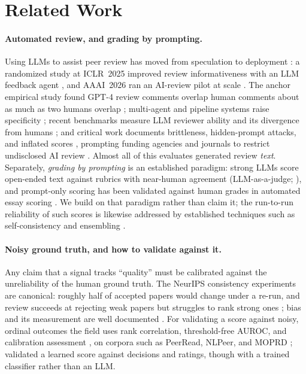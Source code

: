 \section{Related Work}
\label{sec:related}

\paragraph{Automated review, and grading by prompting.}
Using LLMs to assist peer review has moved from speculation to deployment
\citep{zhuang2025asprsurvey}: a randomized study at ICLR~2025 improved review informativeness with
an LLM feedback agent \citep{thakkar2026feedback}, and AAAI~2026 ran an AI-review pilot at scale
\citep{biswas2026aaai}. The anchor empirical study found GPT-4 review comments overlap
human comments about as much as two humans overlap \citep{liang2024llm}; multi-agent and
pipeline systems raise specificity \citep{darcy2024marg,lu2024aiscientist}; recent
benchmarks measure LLM reviewer ability and its divergence from humans
\citep{li2026llmreviewer,reviewertoo2025}; and critical work documents brittleness,
hidden-prompt attacks, and inflated scores
\citep{du2024llmsassist,zhou2024reliable,lin2025hidden,zhou2025positivereview,russolatona2024lottery,pangram2026iclr,zhu2025reviewer},
prompting funding agencies and journals to restrict undisclosed AI review
\citep{science2025funding}. Almost all of this evaluates generated review \emph{text}.
Separately, \emph{grading by prompting} is an established paradigm: strong LLMs score
open-ended text against rubrics with near-human agreement (LLM-as-a-judge;
\citealp{zheng2023judging,liu2023geval}), and prompt-only scoring has been validated
against human grades in automated essay scoring \citep{mizumoto2023exploring}. We build
on that paradigm rather than claim it; the run-to-run reliability of such scores is likewise
addressed by established techniques such as self-consistency and ensembling
\citep{wang2023selfconsistency}.

\paragraph{Noisy ground truth, and how to validate against it.}
Any claim that a signal tracks ``quality'' must be calibrated against the unreliability
of the human ground truth. The NeurIPS consistency experiments are canonical: roughly
half of accepted papers would change under a re-run, and review succeeds at rejecting
weak papers but struggles to rank strong ones
\citep{cortes2021inconsistency,beygelzimer2023arbitrary}; bias and its measurement are
well documented \citep{tomkins2017reviewerbias,stelmakh2019biases,shah2022challenges}.
For validating a score against noisy, ordinal outcomes the field uses rank correlation,
threshold-free AUROC, and calibration assessment \citep{spearman1904,guo2017calibration},
on corpora such as PeerRead, NLPeer, and MOPRD
\citep{kang2018peerread,dycke2023nlpeer,lin2023moprd};
\citet{checco2021aiassisted} validated a learned score against decisions and ratings,
though with a trained classifier rather than an LLM.

